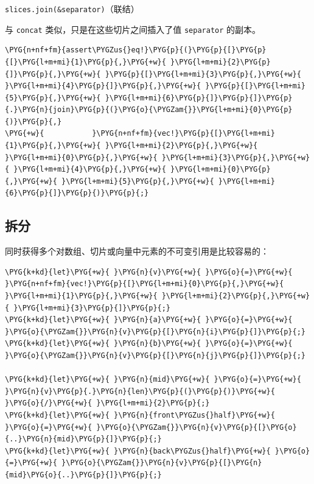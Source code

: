 \begin{mySidenote}
\texttt{slices.join(\&separator)}（联结）
\end{mySidenote}

与 \texttt{concat} 类似，只是在这些切片之间插入了值 \texttt{separator} 的副本。

\begin{Verbatim}[commandchars=\\\{\},breaklines=true,breakanywhere=true,fontsize=\codefont,xleftmargin=17bp]
\PYG{n+nf+fm}{assert\PYGZus{}eq!}\PYG{p}{(}\PYG{p}{[}\PYG{p}{[}\PYG{l+m+mi}{1}\PYG{p}{,}\PYG{+w}{ }\PYG{l+m+mi}{2}\PYG{p}{]}\PYG{p}{,}\PYG{+w}{ }\PYG{p}{[}\PYG{l+m+mi}{3}\PYG{p}{,}\PYG{+w}{ }\PYG{l+m+mi}{4}\PYG{p}{]}\PYG{p}{,}\PYG{+w}{ }\PYG{p}{[}\PYG{l+m+mi}{5}\PYG{p}{,}\PYG{+w}{ }\PYG{l+m+mi}{6}\PYG{p}{]}\PYG{p}{]}\PYG{p}{.}\PYG{n}{join}\PYG{p}{(}\PYG{o}{\PYGZam{}}\PYG{l+m+mi}{0}\PYG{p}{)}\PYG{p}{,}
\PYG{+w}{           }\PYG{n+nf+fm}{vec!}\PYG{p}{[}\PYG{l+m+mi}{1}\PYG{p}{,}\PYG{+w}{ }\PYG{l+m+mi}{2}\PYG{p}{,}\PYG{+w}{ }\PYG{l+m+mi}{0}\PYG{p}{,}\PYG{+w}{ }\PYG{l+m+mi}{3}\PYG{p}{,}\PYG{+w}{ }\PYG{l+m+mi}{4}\PYG{p}{,}\PYG{+w}{ }\PYG{l+m+mi}{0}\PYG{p}{,}\PYG{+w}{ }\PYG{l+m+mi}{5}\PYG{p}{,}\PYG{+w}{ }\PYG{l+m+mi}{6}\PYG{p}{]}\PYG{p}{)}\PYG{p}{;}
\end{Verbatim}

\subsection{拆分}

同时获得多个对数组、切片或向量中元素的不可变引用是比较容易的：

\begin{Verbatim}[commandchars=\\\{\},breaklines=true,breakanywhere=true,fontsize=\codefont,xleftmargin=17bp]
\PYG{k+kd}{let}\PYG{+w}{ }\PYG{n}{v}\PYG{+w}{ }\PYG{o}{=}\PYG{+w}{ }\PYG{n+nf+fm}{vec!}\PYG{p}{[}\PYG{l+m+mi}{0}\PYG{p}{,}\PYG{+w}{ }\PYG{l+m+mi}{1}\PYG{p}{,}\PYG{+w}{ }\PYG{l+m+mi}{2}\PYG{p}{,}\PYG{+w}{ }\PYG{l+m+mi}{3}\PYG{p}{]}\PYG{p}{;}
\PYG{k+kd}{let}\PYG{+w}{ }\PYG{n}{a}\PYG{+w}{ }\PYG{o}{=}\PYG{+w}{ }\PYG{o}{\PYGZam{}}\PYG{n}{v}\PYG{p}{[}\PYG{n}{i}\PYG{p}{]}\PYG{p}{;}
\PYG{k+kd}{let}\PYG{+w}{ }\PYG{n}{b}\PYG{+w}{ }\PYG{o}{=}\PYG{+w}{ }\PYG{o}{\PYGZam{}}\PYG{n}{v}\PYG{p}{[}\PYG{n}{j}\PYG{p}{]}\PYG{p}{;}

\PYG{k+kd}{let}\PYG{+w}{ }\PYG{n}{mid}\PYG{+w}{ }\PYG{o}{=}\PYG{+w}{ }\PYG{n}{v}\PYG{p}{.}\PYG{n}{len}\PYG{p}{(}\PYG{p}{)}\PYG{+w}{ }\PYG{o}{/}\PYG{+w}{ }\PYG{l+m+mi}{2}\PYG{p}{;}
\PYG{k+kd}{let}\PYG{+w}{ }\PYG{n}{front\PYGZus{}half}\PYG{+w}{ }\PYG{o}{=}\PYG{+w}{ }\PYG{o}{\PYGZam{}}\PYG{n}{v}\PYG{p}{[}\PYG{o}{..}\PYG{n}{mid}\PYG{p}{]}\PYG{p}{;}
\PYG{k+kd}{let}\PYG{+w}{ }\PYG{n}{back\PYGZus{}half}\PYG{+w}{ }\PYG{o}{=}\PYG{+w}{ }\PYG{o}{\PYGZam{}}\PYG{n}{v}\PYG{p}{[}\PYG{n}{mid}\PYG{o}{..}\PYG{p}{]}\PYG{p}{;}
\end{Verbatim}

